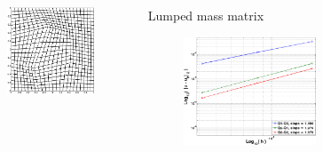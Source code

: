 \documentclass[8pt,xcolor=svgnames]{beamer}
\begin{document}
\begin{frame}
\begin{columns}
\begin{column}{0.6\textwidth}
\begin{columns}
\begin{column}{0.3\textwidth}
\begin{figure}[h!]
    \end{figure}
    \end{column}
    \begin{column}{0.3\textwidth}
    \begin{figure}[h!]
    \centering
    \includegraphics[width=1.0\textwidth,keepaspectratio=true]{./Images/GradPMesh_h3.png}
    \end{figure}
    \end{column}
    \end{columns}
  \end{column}
  \begin{column}{0.4\textwidth}
  \centering
  \small{Lumped mass matrix}
   \begin{figure}[h!]
    \centering
    \includegraphics[width=0.8\textwidth,keepaspectratio=true]{./Images/GradPError_Lumped.png}

\end{figure}
\end{column}
\end{columns}
\end{frame}
\end{document}
